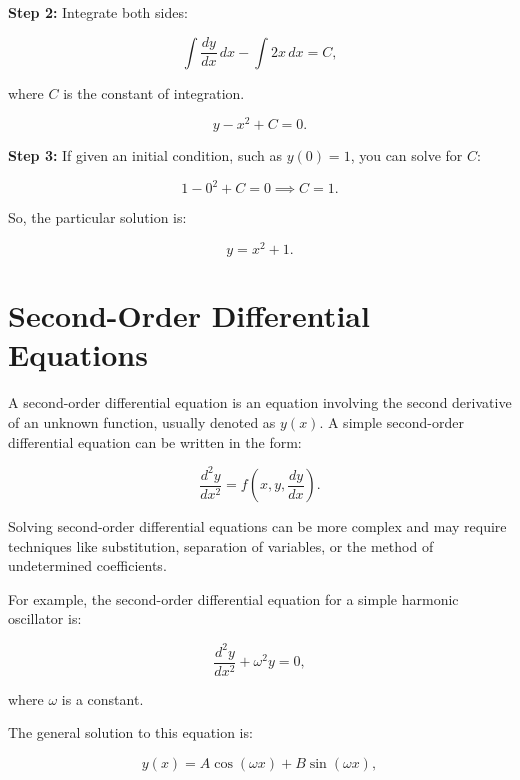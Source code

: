 \documentclass{article}
\begin{document}
\textbf{Step 2:} Integrate both sides:

\begin{equation}
\int \frac{dy}{dx} \, dx - \int 2x \, dx = C,
\end{equation}

where $C$ is the constant of integration.

\begin{equation}
y - x^2 + C = 0.
\end{equation}

\textbf{Step 3:} If given an initial condition, such as $y(0) = 1$, you can solve for $C$:

\begin{equation}
1 - 0^2 + C = 0 \implies C = 1.
\end{equation}

So, the particular solution is:

\begin{equation}
y = x^2 + 1.
\end{equation}

\section{Second-Order Differential Equations}

A second-order differential equation is an equation involving the second derivative of an unknown function, usually denoted as $y(x)$. A simple second-order differential equation can be written in the form:

\begin{equation}
\frac{d^2y}{dx^2} = f(x, y, \frac{dy}{dx}).
\end{equation}

Solving second-order differential equations can be more complex and may require techniques like substitution, separation of variables, or the method of undetermined coefficients.

For example, the second-order differential equation for a simple harmonic oscillator is:

\begin{equation}
\frac{d^2y}{dx^2} + \omega^2 y = 0,
\end{equation}

where $\omega$ is a constant.

The general solution to this equation is:

\begin{equation}
y(x) = A \cos(\omega x) + B \sin(\omega x),
\end{equation}
\end{document}
